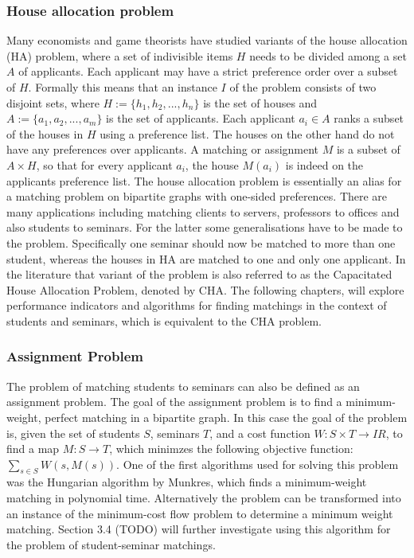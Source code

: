 \subsubsection{House allocation problem}
Many economists and game theorists\cite{FEKETE2003219} have studied variants of the house allocation (HA) problem, where a set of indivisible items $H$ needs to be divided among a set $A$ of applicants. Each applicant may have a strict preference order over a subset of $H$. Formally this means that an instance $I$ of the problem consists of two disjoint sets, where $H := \{h_1, h_2, ..., h_n\}$ is the set of houses and $A := \{a_1, a_2, ..., a_m\}$ is the set of applicants. Each applicant $a_i \in A$ ranks a subset of the houses in $H$ using a preference list. The houses on the other hand do not have any preferences over applicants. A matching or assignment $M$ is a subset of $A \times H$, so that for every applicant $a_i$, the house $M(a_i)$ is indeed on the applicants preference list.\cite{SngThesis} 
\newline
The house allocation problem is essentially an alias for a matching problem on bipartite graphs with one-sided preferences. There are many applications including matching clients to servers, professors to offices and also students to seminars. For the latter some generalisations have to be made to the problem. Specifically one seminar should now be matched to more than one student, whereas the houses in HA are matched to one and only one applicant. In the literature that variant of the problem is also referred to as the Capacitated House Allocation Problem, denoted by CHA.\cite{algorithmics} The following chapters, will explore performance indicators and algorithms for finding matchings in the context of students and seminars, which is equivalent to the CHA problem.

\subsubsection{Assignment Problem}\label{intro_assignment}
The problem of matching students to seminars can also be defined as an assignment problem. The goal of the assignment problem is to find a minimum-weight, perfect matching in a bipartite graph. In this case the goal of the problem is, given the set of students $S$, seminars $T$, and a cost function $W: S \times T \rightarrow I\!R$, to find a map $M: S \rightarrow T$, which minimzes the following objective function:
$\sum_{s \in S} W(s, M(s))$.
\newline
One of the first algorithms used for solving this problem was the Hungarian algorithm by Munkres, which finds a minimum-weight matching in polynomial time.\cite{Munkres} 
\newline
Alternatively the problem can be transformed into an instance of the minimum-cost flow problem to determine a minimum weight matching. Section 3.4 (TODO) will further investigate using this algorithm for the problem of student-seminar matchings.

